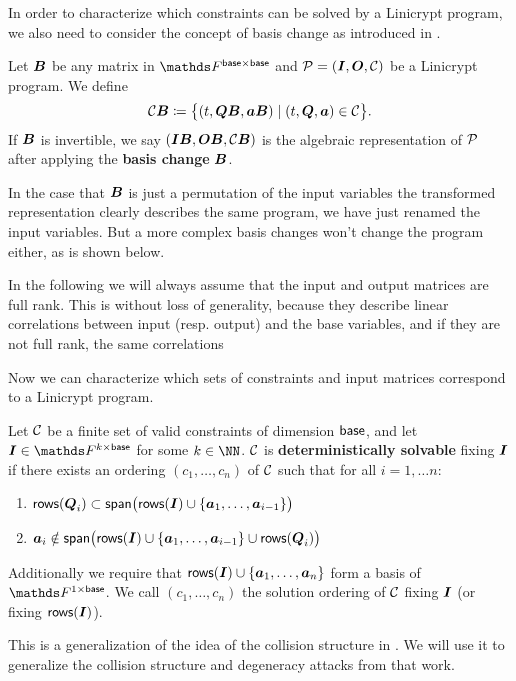 In order to characterize which constraints can be solved by a Linicrypt program,
we also need to consider the concept of basis change as introduced in \cite{C:CarRos16}.

\begin{defn}
    Let $\v B$ be any matrix in $\F^{\base \times \base}$
    and $\P = (\Inp, \O, \C)$ be a Linicrypt program.
    We define 
    \[
        \C \B \coloneqq \big\{ (t, \Q \B, \va \B) \mid (t, \Q, \va) \in \C \big\}.
    \]
    If $\B$ is invertible,
    we say $(\Inp \B, \O \B, \C \B)$ is the algebraic representation of $\P$
    after applying the \textbf{basis change} $\B$.
\end{defn}

In the case that $\B$ is just a permutation of the input variables
the transformed representation clearly describes the same program,
we have just renamed the input variables.
But a more complex basis changes won't change the program either, as is shown below.

In the following we will always assume that the input and output matrices are full rank.
This is without loss of generality,
because they describe linear correlations between input (resp. output) and the base variables,
and if they are not full rank, the same correlations

Now we can characterize which sets of constraints and input matrices correspond to a Linicrypt program.

\begin{defn}
Let $\C$ be a finite set of valid constraints of dimension $\base$,
and let $\I \in \F^{k \times \base}$ for some $k \in \NN$.
$\C$ is \textbf{deterministically solvable} fixing $\I$
if there exists an ordering $(c_1, \dots, c_n)$ of $\C$
such that for all $i=1, \dots n$:
\begin{enumerate}
\item
    \label{solvable1}
    $\rows(\Q_i) \subset \spn \big(\rows(\I) \cup \{\va_1, \dots, \va_{i-1}\}\big)$
\item
    \label{solvable2}
    $\va_i \notin \spn \big(\rows(\I) \cup \{\va_1, \dots, \va_{i-1}\} \cup \rows(\Q_i) \big)$
\end{enumerate}
Additionally we require that $\rows(\I) \cup \{\va_1, \dots, \va_n\}$ form a basis of $\F^{1\times\base}$.
We call $(c_1, \dots, c_n)$ the solution ordering of $\C$ fixing $\I$ (or fixing $\rows(\I)$).
\end{defn}

This is a generalization of the idea of the collision structure in \cite{TCC:McQSwoRos19}.
We will use it to generalize the collision structure and degeneracy attacks from that work.


